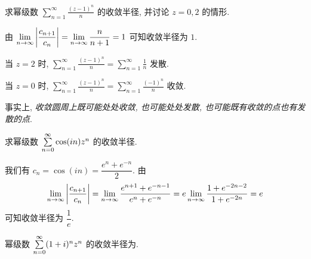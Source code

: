 \begin{example}
	求幂级数 $\displaystyle\sum_{n=1}^\infty\frac{(z-1)^n}n$ 的收敛半径, 并讨论 $z=0,2$ 的情形.
\end{example}

\begin{solution}
	由 $\displaystyle\lim_{n\to\infty}\left|\frac{c_{n+1}}{c_n}\right|=\lim_{n\to\infty}\frac n{n+1}=1$ 可知收敛半径为 $1$.

	{当 $z=2$ 时, $\displaystyle\sum_{n=1}^\infty\frac{(z-1)^n}n=\sum_{n=1}^\infty\frac1n$ 发散.}

	{当 $z=0$ 时, $\displaystyle\sum_{n=1}^\infty\frac{(z-1)^n}n=\sum_{n=1}^\infty\frac{(-1)^n}n$ 收敛.}
\end{solution}

事实上, \emph{收敛圆周上既可能处处收敛, 也可能处处发散, 也可能既有收敛的点也有发散的点}.

\begin{example}
	求幂级数 $\sum\limits_{n=0}^\infty\cos(in)z^n$ 的收敛半径.
\end{example}

\begin{solution}
	我们有 $c_n=\cos(in)=\dfrac{e^n+e^{-n}}2$.
	{由
		\[\lim_{n\to\infty}\left|\frac{c_{n+1}}{c_n}\right|=\lim_{n\to\infty}\frac{e^{n+1}+e^{-n-1}}{e^n+e^{-n}}=e\lim_{n\to\infty}\frac{1+e^{-2n-2}}{1+e^{-2n}}=e\]
	可知收敛半径为 $\dfrac1e$.}
\end{solution}

\begin{exercise}
	幂级数 $\sum\limits_{n=0}^\infty(1+i)^nz^n$ 的收敛半径为.
\end{exercise}

% 
% 
% 

